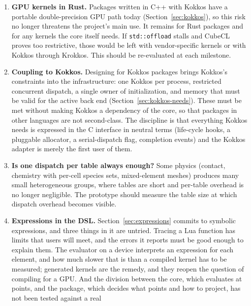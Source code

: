 \documentclass[11pt,a4paper]{article}
\newcommand{\code}[1]{\texttt{#1}}
\begin{document}
\begin{enumerate}
  \item \label{risk:gpu} \textbf{GPU kernels in Rust.}  Packages written in C++ with Kokkos
        have a portable double-precision GPU path today
        (Section~\ref{sec:kokkos}), so this risk no longer threatens the
        project's main use.  It remains for Rust packages and for any kernels
        the core itself needs.  If \code{std::offload} stalls and CubeCL
        proves too restrictive, those would be left with vendor-specific
        kernels or with Kokkos through Krokkos.  This should be re-evaluated
        at each milestone.
  \item \textbf{Coupling to Kokkos.}  Designing for Kokkos packages brings
        Kokkos's constraints into the infrastructure: one Kokkos per process,
        restricted concurrent dispatch, a single owner of initialization, and
        memory that must be valid for the active back end
        (Section~\ref{sec:kokkos-needs}).  These must be met without making
        Kokkos a dependency of the core, so that packages in other languages
        are not second-class.  The discipline is that everything Kokkos
        needs is expressed in the C interface in neutral terms (life-cycle
        hooks, a pluggable allocator, a serial-dispatch flag, completion
        events) and the Kokkos adapter is merely the first user of them.
  \item \label{risk:dispatch} \textbf{Is one dispatch per table always enough?}  Some physics
        (contact, chemistry with per-cell species sets, mixed-element meshes)
        produces many small heterogeneous groups, where tables are short and
        per-table overhead is no longer negligible.  The prototype should
        measure the table size at which dispatch overhead becomes visible.
  \item \textbf{Expressions in the DSL.}  Section~\ref{sec:expressions}
        commits to symbolic expressions, and three things in it are untried.
        Tracing a Lua function has limits that users will meet, and the
        errors it reports must be good enough to explain them.  The
        evaluator on a device interprets an expression for each element,
        and how much slower that is than a compiled kernel has to be
        measured; generated kernels are the remedy, and they reopen the
        question of compiling for a GPU.  And the division between the core,
        which evaluates at points, and the package, which decides what
        points and how to project, has not been tested against a real

\end{enumerate}
\end{document}
